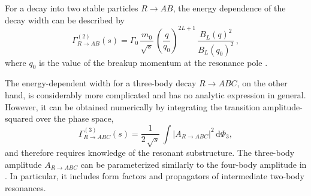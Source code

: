 For a decay into two stable particles $R \to AB$, the energy dependence of the decay width can be described by 
\begin{equation}
	\Gamma_{R \to AB}^{(2)}(s) = \Gamma_{0} \, \frac{m_{0}}{\sqrt s} \, \left(\frac{q}{q_{0}}\right)^{2L+1} \, \frac{B_{L}(q)^{2}}{B_{L}(q_{0})^{2}}  \, ,
	\label{eq:gamma2}
\end{equation}
where $q_{0}$ is the value of the breakup momentum at the resonance pole \cite{BW}.

The energy-dependent width for a three-body decay $R \to ABC$, on the other hand, is considerably more complicated and has no
analytic expression in general. However, it 
can be obtained numerically by integrating the transition amplitude-squared over the phase space,
\begin{equation}
	\Gamma_{R \to ABC}^{(3)}(s) =  \frac{1}{2 \, \sqrt s} \, \int \vert A_{R \to ABC} \vert^{2} \, \text{d}\Phi_{3}   ,
	\label{eq:gamma3}
\end{equation}
and therefore requires knowledge of the resonant substructure. 
The three-body amplitude $A_{R \to ABC}$ can be parameterized 
similarly to
the four-body amplitude in .
In particular, it includes form factors and propagators of intermediate two-body resonances.


